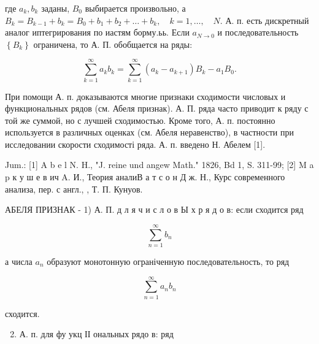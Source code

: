 \documentclass[10pt]{article}
\begin{document}
где $a_{k}, b_{k}$ заданы, $B_{0}$ выбирается произвольно, а $B_{k}=B_{k-1}+b_{k}=B_{0}+b_{1}+b_{2}+\ldots+b_{k}, \quad k=1, \ldots, \quad N$. А. п. есть дискретный аналог иптегрирования по иастям борму.ьь. Если $a_{N \rightarrow 0}$ и последовательность $\left\{B_{k}\right\}$ ограничена, то А. П. обобщается на ряды:



\[

\sum_{k=1}^{\infty} a_{k} b_{k}=\sum_{k=1}^{\infty}\left(a_{k}-a_{k+1}\right) B_{k}-a_{1} B_{0} .

\]



При помощи А. п. доказываются многие признаки сходимости числовых и функциональных рядов (см. Абеля признак). А. П. ряда часто приводит к ряду с той же суммой, но с лучшей сходимостью. Кроме того, А. п. постоянно используется в различных оценках (см. Абеля неравенство), в частности при исследовании скорости сходимості ряда. А. п. введено Н. Абелем [1].



Jum.: [1] A b e l N. H., "J. reine und angew Math." 1826, Bd 1, S. 311-99; [2] M a p к у ш е в ич A. И., Теория аналиВ а т с о н Д ж. Н., Курс современного анализа, пер. с англ., , Т. П. Кунуов.



АБЕЛЯ ПРИЗНАК - 1) А. П. д л я ч и с л о в Ы х р я д о в: если сходится ряд



\[

\sum_{n=1}^{\infty} b_{n}

\]



а числа $a_{n}$ образуют монотонную ограніченную последовательность, то ряд



\[

\sum_{n=1}^{\infty} a_{n} b_{n}

\]



сходится.



\begin{enumerate}

  \setcounter{enumi}{1}

  \item А. п. для фу укц ІІ ональных рядо в: ряд

\end{enumerate}
\end{document}
